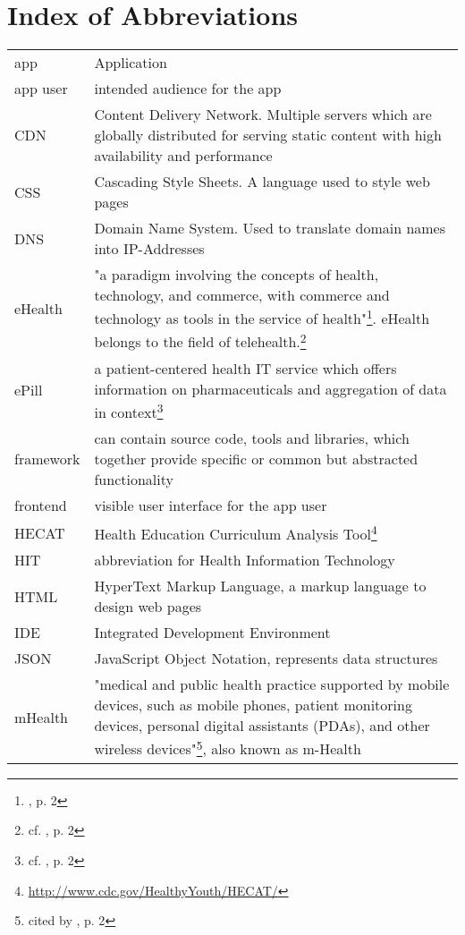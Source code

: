 \section*{Index of Abbreviations}
\begin{longtable}{@{}p{}@{}p{}@{}}
    app & Application \\
    app user & intended audience for the app \\
    CDN & Content Delivery Network. Multiple servers which are globally distributed for serving static content with high availability and performance \\
    CSS & Cascading Style Sheets. A language used to style web pages \\
    DNS & Domain Name System. Used to translate domain names into IP-Addresses \\
    eHealth & "a paradigm involving the concepts of health, technology, and commerce, with commerce and technology as tools in the service of health"\footnote{\cite{MartinezPerez.2013}, p. 2}. eHealth belongs to the field of telehealth.\footnote{cf. \cite{MartinezPerez.2013}, p. 2} \\
    ePill & a patient-centered health IT service which offers information on pharmaceuticals and aggregation of data in context\footnote{cf. \cite{Dehling.2012b}, p. 2} \\
    framework & can contain source code, tools and libraries, which together provide specific or common but abstracted functionality \\
    frontend & visible user interface for the app user \\
    HECAT & Health Education Curriculum Analysis Tool\footnote{\url{http://www.cdc.gov/HealthyYouth/HECAT/}} \\
    HIT & abbreviation for Health Information Technology \\
    HTML & HyperText Markup Language, a markup language to design web pages \\
    IDE & Integrated Development Environment \\
    JSON & JavaScript Object Notation, represents data structures \\
    mHealth & "medical and public health practice supported by mobile devices, such as mobile phones, patient monitoring devices, personal digital assistants (PDAs), and other wireless devices"\footnote{\cite{WorldHealthOrganization.2011} cited by \cite{MartinezPerez.2013}, p. 2}, also known as m-Health \\

\end{longtable}
